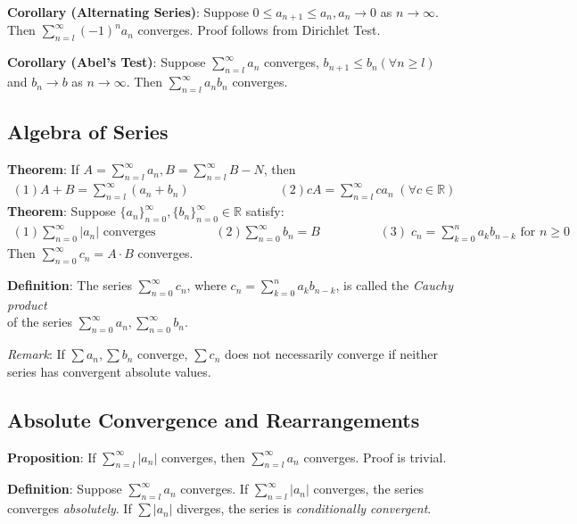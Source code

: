 \documentclass[11pt]{article}
\begin{document}
\textbf{Corollary (Alternating Series)}: Suppose $0 \leq a_{n+1} \leq a_n, a_n \to 0$ as $n \to \infty$. Then $\sum_{n=l}^\infty (-1)^n a_n$ converges. Proof follows from Dirichlet Test.

\textbf{Corollary (Abel's Test)}: Suppose $\sum_{n=l}^\infty a_n$ converges, $b_{n+1} \leq b_n (\forall n \geq l)$ and $b_n \to b$ as $n \to \infty$. Then $\sum_{n=l}^\infty a_nb_n$ converges.

\subsection{Algebra of Series}

\textbf{Theorem}: If $A = \sum_{n=l}^\infty a_n, B = \sum_{n=l}^\infty B-N$, then
\begin{align*}
(1) A + B = \sum_{n=l}^\infty (a_n + b_n) \hspace{3cm} (2) cA = \sum_{n=l}^\infty ca_n \;(\forall c \in \mathbb{R})
\end{align*}
\textbf{Theorem}: Suppose $\{a_n\}_{n=0}^\infty, \{b_n\}_{n=0}^\infty \in \mathbb{R}$ satisfy:
\begin{align*}
(1) \sum_{n=0}^\infty |a_n| \text{ converges} \hspace{2cm}
(2) \sum_{n=0}^\infty b_n = B \hspace{2cm}
(3)\; c_n = \sum_{k=0}^n a_kb_{n-k}\text{ for }n \geq 0
\end{align*}
Then $\sum_{n=0}^\infty c_n = A \cdot B$ converges.

\textbf{Definition}: The series $\sum\limits_{n=0}^\infty c_n$, where $c_n = \sum\limits_{k=0}^n a_k b_{n-k}$, is called the \emph{Cauchy product}\\ of the series $\sum\limits_{n=0}^\infty a_n, \sum\limits_{n=0}^\infty b_n$.

\emph{Remark}: If $\sum a_n, \sum b_n$ converge, $\sum c_n$ does not necessarily converge if neither series has convergent absolute values.

\subsection{Absolute Convergence and Rearrangements}

\textbf{Proposition}: If $\sum_{n=l}^\infty |a_n|$ converges, then $\sum_{n=l}^\infty a_n$ converges. Proof is trivial.

\textbf{Definition}: Suppose $\sum_{n=l}^\infty a_n$ converges. If $\sum_{n=l}^\infty |a_n|$ converges, the series converges \emph{absolutely}. If $\sum |a_n|$ diverges, the series is \emph{conditionally convergent}.
\end{document}
